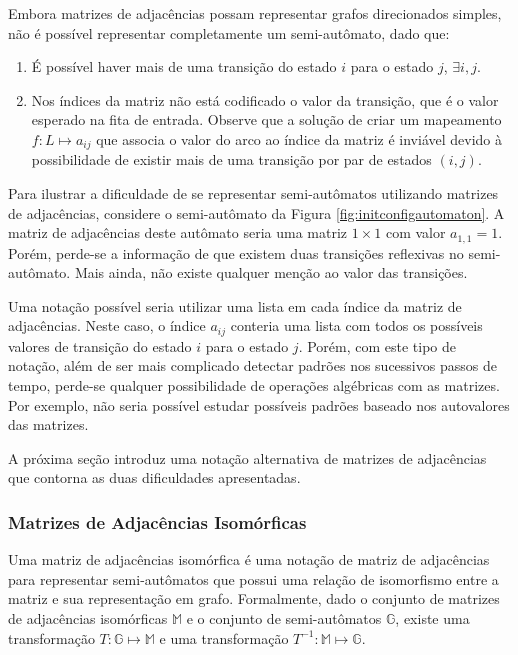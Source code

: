 \documentclass[12pt,a4paper]{article}
\begin{document}
Embora matrizes de adjacências possam representar grafos direcionados simples,
não é possível representar completamente um semi-autômato, dado que:

\begin{enumerate}
\item É possível haver mais de uma transição do estado $i$ para o estado
$j$, $\exists i,j$.

\item Nos índices da matriz não está codificado o valor da transição, que
é o valor esperado na fita de entrada. Observe que a solução de criar
um mapeamento $f: L \mapsto a_{ij}$ que associa o valor do arco ao índice
da matriz é inviável devido à possibilidade de existir mais de uma
transição por par de estados $(i,j)$.
\end{enumerate}

Para ilustrar a dificuldade de se representar semi-autômatos utilizando
matrizes de adjacências, considere o semi-autômato da Figura
\ref{fig:initconfigautomaton}. A matriz de adjacências deste autômato
seria uma matriz $1 \times 1$ com valor $a_{1,1}=1$. Porém, perde-se a informação
de que existem duas transições reflexivas no semi-autômato. Mais ainda,
não existe qualquer menção ao valor das transições.

Uma notação possível seria utilizar uma lista em cada índice da matriz de
adjacências. Neste caso, o índice $a_{ij}$ conteria uma lista com todos
os possíveis valores de transição do estado $i$ para o estado $j$.
Porém, com este tipo de notação, além de ser mais complicado
detectar padrões nos sucessivos passos de tempo, perde-se qualquer possibilidade
de operações algébricas com as matrizes. Por exemplo, não seria possível
estudar possíveis padrões baseado nos autovalores das matrizes.

A próxima seção introduz uma notação alternativa de matrizes de
adjacências que contorna as duas dificuldades apresentadas.

\subsubsection{Matrizes de Adjacências Isomórficas}

Uma matriz de adjacências isomórfica é uma notação de matriz de
adjacências para representar semi-autômatos que possui uma relação
de isomorfismo entre a matriz e sua representação em grafo.
Formalmente, dado o conjunto de matrizes de adjacências
isomórficas $\mathbb{M}$ e o conjunto de semi-autômatos $\mathbb{G}$,
existe uma transformação $T: \mathbb{G} \mapsto \mathbb{M}$ e uma
transformação $T^{-1}: \mathbb{M} \mapsto \mathbb{G}$. 
\end{document}
